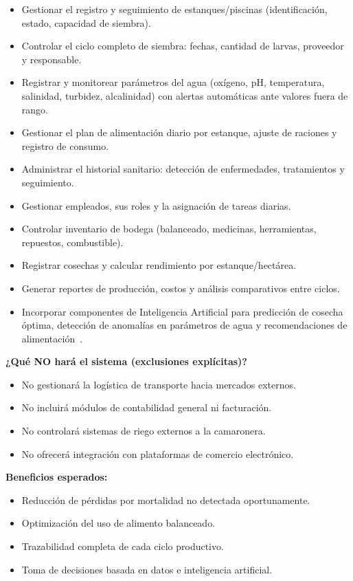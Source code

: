 \documentclass[11pt,a4paper]{article}
\begin{document}
\begin{itemize}
    \item Gestionar el registro y seguimiento de estanques/piscinas (identificación, estado, capacidad de siembra).
    \item Controlar el ciclo completo de siembra: fechas, cantidad de larvas, proveedor y responsable.
    \item Registrar y monitorear parámetros del agua (oxígeno, pH, temperatura, salinidad, turbidez, alcalinidad) con alertas automáticas ante valores fuera de rango.
    \item Gestionar el plan de alimentación diario por estanque, ajuste de raciones y registro de consumo.
    \item Administrar el historial sanitario: detección de enfermedades, tratamientos y seguimiento.
    \item Gestionar empleados, sus roles y la asignación de tareas diarias.
    \item Controlar inventario de bodega (balanceado, medicinas, herramientas, repuestos, combustible).
    \item Registrar cosechas y calcular rendimiento por estanque/hectárea.
    \item Generar reportes de producción, costos y análisis comparativos entre ciclos.
    \item Incorporar componentes de Inteligencia Artificial para predicción de cosecha óptima, detección de anomalías en parámetros de agua y recomendaciones de alimentación~\cite{aquaculture_management_2023,ai_aquaculture_2023}.
\end{itemize}

\textbf{¿Qué NO hará el sistema (exclusiones explícitas)?}

\begin{itemize}
    \item No gestionará la logística de transporte hacia mercados externos.
    \item No incluirá módulos de contabilidad general ni facturación.
    \item No controlará sistemas de riego externos a la camaronera.
    \item No ofrecerá integración con plataformas de comercio electrónico.
\end{itemize}

\textbf{Beneficios esperados:}

\begin{itemize}
    \item Reducción de pérdidas por mortalidad no detectada oportunamente.
    \item Optimización del uso de alimento balanceado.
    \item Trazabilidad completa de cada ciclo productivo.
    \item Toma de decisiones basada en datos e inteligencia artificial.
\end{itemize}
\end{document}
